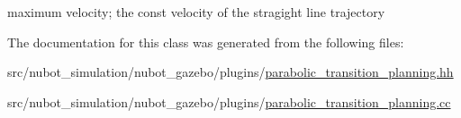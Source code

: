 maximum velocity; the const velocity of the stragight line trajectory 



The documentation for this class was generated from the following files\-:\begin{DoxyCompactItemize}
\item 
src/nubot\-\_\-simulation/nubot\-\_\-gazebo/plugins/\hyperlink{parabolic__transition__planning_8hh}{parabolic\-\_\-transition\-\_\-planning.\-hh}\item 
src/nubot\-\_\-simulation/nubot\-\_\-gazebo/plugins/\hyperlink{parabolic__transition__planning_8cc}{parabolic\-\_\-transition\-\_\-planning.\-cc}\end{DoxyCompactItemize}
